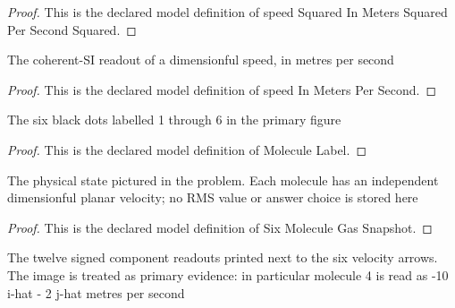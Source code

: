 \begin{proof}
  This is the declared model definition of speed Squared In Meters Squared Per Second Squared.
\end{proof}
\begin{definition}
  \label{def:physics:phyx-mini-0377:phyxminiproblems-problemphyxmini0377-speedinmeterspersecond}
  The coherent-SI readout of a dimensionful speed, in metres per second
\end{definition}
\begin{proof}
  This is the declared model definition of speed In Meters Per Second.
\end{proof}
\begin{definition}
  \label{def:physics:phyx-mini-0377:phyxminiproblems-problemphyxmini0377-moleculelabel}
  The six black dots labelled 1 through 6 in the primary figure
\end{definition}
\begin{proof}
  This is the declared model definition of Molecule Label.
\end{proof}
\begin{definition}
  \label{def:physics:phyx-mini-0377:phyxminiproblems-problemphyxmini0377-sixmoleculegassnapshot}
  The physical state pictured in the problem. Each molecule has an independent dimensionful planar velocity; no RMS value or answer choice is stored here
\end{definition}
\begin{proof}
  This is the declared model definition of Six Molecule Gas Snapshot.
\end{proof}
\begin{definition}
  \label{def:physics:phyx-mini-0377:phyxminiproblems-problemphyxmini0377-matchesproblemandprimaryfigure}
  The twelve signed component readouts printed next to the six velocity arrows. The image is treated as primary evidence: in particular molecule 4 is read as -10 i-hat - 2 j-hat metres per second
\end{definition}
